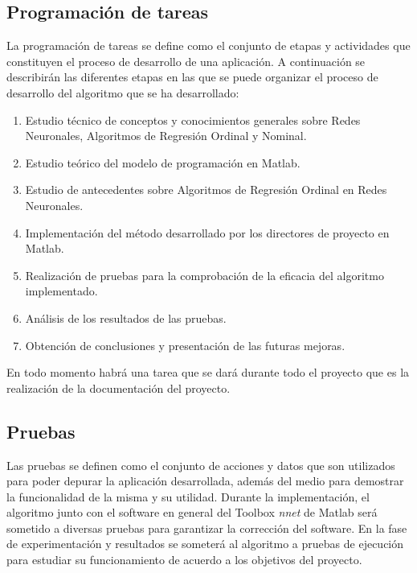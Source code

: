 		\subsection{Programación de tareas}
		
			La programación de tareas se define como el conjunto de etapas y actividades que constituyen el proceso de desarrollo de una aplicación. A continuación se describirán las diferentes etapas en las que se puede organizar el proceso de desarrollo del algoritmo que se ha desarrollado:
		
			\begin{enumerate}
				\item Estudio técnico de conceptos y conocimientos generales sobre Redes Neuronales, Algoritmos de Regresión Ordinal y Nominal.
				\item Estudio teórico del modelo de programación en Matlab.
				\item Estudio de antecedentes sobre Algoritmos de Regresión Ordinal en Redes Neuronales.
				\item Implementación del método desarrollado por los directores de proyecto en Matlab.
				\item Realización de pruebas para la comprobación de la eficacia del algoritmo implementado.
				\item Análisis de los resultados de las pruebas.
				\item Obtención de conclusiones y presentación de las futuras mejoras.
			\end{enumerate}
			
			En todo momento habrá una tarea que se dará durante todo el proyecto que es la realización de la documentación del proyecto.
		
		\subsection{Pruebas}
		
			Las pruebas se definen como el conjunto de acciones y datos que son utilizados para poder depurar la aplicación desarrollada, además del medio para demostrar la funcionalidad de la misma y su utilidad. Durante la implementación, el algoritmo junto con el software en general del Toolbox \textit{nnet} de Matlab será sometido a diversas pruebas para garantizar la corrección del software. En la fase de experimentación y resultados se someterá al algoritmo a pruebas de ejecución para estudiar su funcionamiento de acuerdo a los objetivos del proyecto.
		
